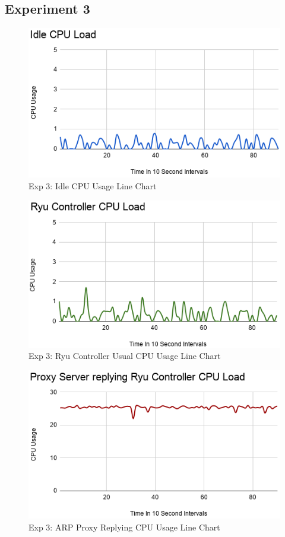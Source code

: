 \documentclass[12pt, oneside]{book}
\begin{document}

\subsection{Experiment 3}
\label{app:Exp3}

\begin{figure}[H]
	\centering
	\includegraphics[scale=0.78]{../tests/CPU/idleCPU.png}
	\caption{Exp 3: Idle CPU Usage Line Chart}
	\label{fig:idlecpu}
\end{figure}

\begin{figure}[H]
	\centering
	\includegraphics[scale=0.78]{../tests/CPU/useCPU.png}
	\caption{Exp 3: Ryu Controller Usual CPU Usage Line Chart}
	\label{fig:controllerCPU}
\end{figure}

\begin{figure}[H]
	\centering
	\includegraphics[scale=0.78]{../tests/CPU/proxyCPU.png}
	\caption{Exp 3: ARP Proxy Replying CPU Usage Line Chart}
	\label{fig:proxyCPU}
\end{figure}

\end{document}
